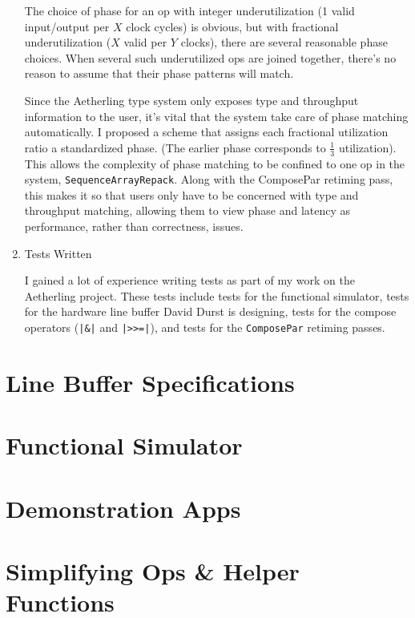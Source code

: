 \documentclass[12pt]{article}
\begin{document}
\begin{enumerate}
The choice of phase for an op with integer underutilization (1 valid
input/output per $X$ clock cycles) is obvious, but with fractional
underutilization ($X$ valid per $Y$ clocks), there are several
reasonable phase choices. When several such underutilized ops are
joined together, there's no reason to assume that their phase patterns
will match.

Since the Aetherling type system only exposes type and throughput
information to the user, it's vital that the system take care of phase
matching automatically. I proposed a scheme that assigns each
fractional utilization ratio a standardized phase. (The earlier phase
corresponds to $\frac{1}{3}$ utilization). This allows the complexity
of phase matching to be confined to one op in the system,
\texttt{SequenceArrayRepack}. Along with the ComposePar retiming pass,
this makes it so that users only have to be concerned with type and
throughput matching, allowing them to view phase and latency as
performance, rather than correctness, issues.

\item Tests Written

I gained a lot of experience writing tests as part of my work on the
Aetherling project. These tests include tests for the functional
simulator, tests for the hardware line buffer David Durst is
designing, tests for the compose operators (\texttt{|\&|} and
\texttt{|>>=|}), and tests for the \texttt{ComposePar} retiming passes.

\end{enumerate}

\section{Line Buffer Specifications}

\section{Functional Simulator}

\section{Demonstration Apps}


\section{Simplifying Ops \& Helper Functions}
\end{document}
